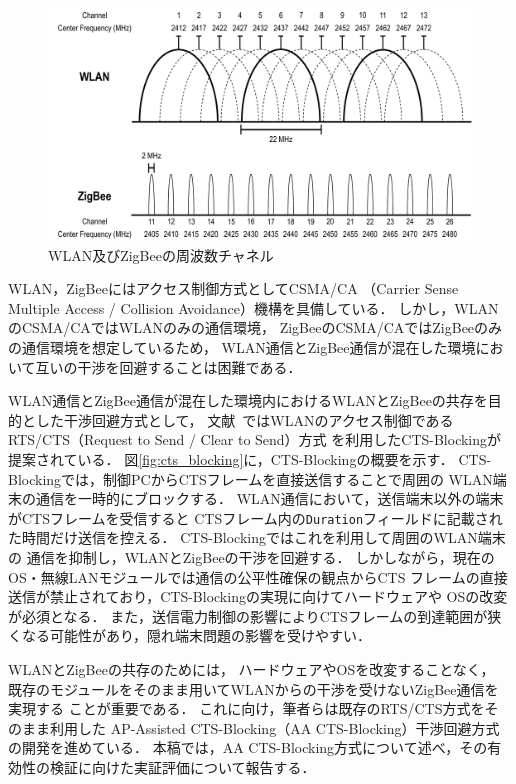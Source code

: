 \documentclass[12pt]{jreport}
\begin{document}
\begin{figure}[bt]
 \centering
 \includegraphics[width=\columnwidth]{figure/frequency.pdf}
 \caption{WLAN及びZigBeeの周波数チャネル}
 \label{fig:frequency}
\end{figure}

WLAN，ZigBeeにはアクセス制御方式としてCSMA/CA
（Carrier Sense Multiple Access / Collision Avoidance）機構を具備している．
しかし，WLANのCSMA/CAではWLANのみの通信環境，
ZigBeeのCSMA/CAではZigBeeのみの通信環境を想定しているため，
WLAN通信とZigBee通信が混在した環境において互いの干渉を回避することは困難である．

WLAN通信とZigBee通信が混在した環境内におけるWLANとZigBeeの共存を目的とした干渉回避方式として，
文献~\cite{hou09:minimize_intf}ではWLANのアクセス制御であるRTS/CTS（Request to Send / Clear to Send）方式
を利用したCTS-Blockingが提案されている．
図\ref{fig:cts_blocking}に，CTS-Blockingの概要を示す．
CTS-Blockingでは，制御PCからCTSフレームを直接送信することで周囲の
WLAN端末の通信を一時的にブロックする．
WLAN通信において，送信端末以外の端末がCTSフレームを受信すると
CTSフレーム内の\texttt{Duration}フィールドに記載された時間だけ送信を控える．
CTS-Blockingではこれを利用して周囲のWLAN端末の
通信を抑制し，WLANとZigBeeの干渉を回避する．
しかしながら，現在のOS・無線LANモジュールでは通信の公平性確保の観点からCTS
フレームの直接送信が禁止されており，CTS-Blockingの実現に向けてハードウェアや
OSの改変が必須となる．
また，送信電力制御の影響によりCTSフレームの到達範囲が狭くなる可能性があり，隠れ端末問題の影響を受けやすい．

WLANとZigBeeの共存のためには，%
ハードウェアやOSを改変することなく，
既存のモジュールをそのまま用いてWLANからの干渉を受けないZigBee通信を実現する
ことが重要である．
これに向け，筆者らは既存のRTS/CTS方式をそのまま利用した
AP-Assisted CTS-Blocking（AA CTS-Blocking）干渉回避方式の開発を進めている．
本稿では，AA CTS-Blocking方式について述べ，その有効性の検証に向けた実証評価について報告する．
\end{document}

